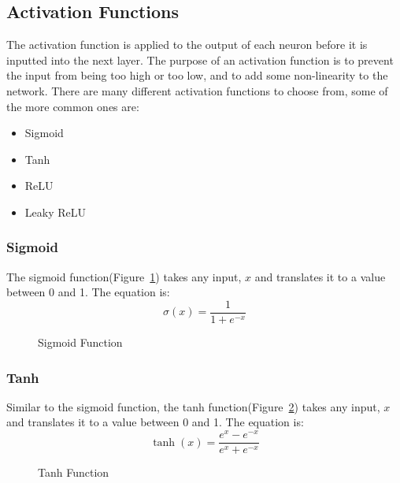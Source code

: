 \documentclass[titlepage]{article}
\begin{document}
\subsection{Activation Functions}
The activation function is applied to the output of each neuron before it is inputted into the next layer. The purpose of an activation function is to prevent the input from being too high or too low, and to add some non-linearity to the network. There are many different activation functions to choose from, some of the more common ones are:
\begin{itemize}
    \item Sigmoid
    \item Tanh
    \item ReLU
    \item Leaky ReLU
\end{itemize}
\subsubsection{Sigmoid}
The sigmoid function(Figure~\ref{fig:sigmoid_function}) takes any input, $x$ and translates it to a value between 0 and 1. The equation is:
\begin{equation}
    \sigma(x) = \frac{1}{1 + e^{-x}}
    \label{eq:sigmoid}
\end{equation}
\begin{figure}[h!]
    \begin{center}
    \end{center}
    \caption{Sigmoid Function}    
    \label{fig:sigmoid_function}
\end{figure}


\subsubsection{Tanh}
Similar to the sigmoid function, the tanh function(Figure~\ref{fig:tanh}) takes any input, $x$ and translates it to a value between 0 and 1. The equation is:
\begin{equation}
    \tanh(x) = \frac{e^{x} - e^{-x}}{e^{x} + e^{-x}}
    \label{eq:tanh}
\end{equation}
\begin{figure}[h!]
    \begin{center}
    \end{center}
    \caption{Tanh Function}    
    \label{fig:tanh}
\end{figure}
\end{document}
